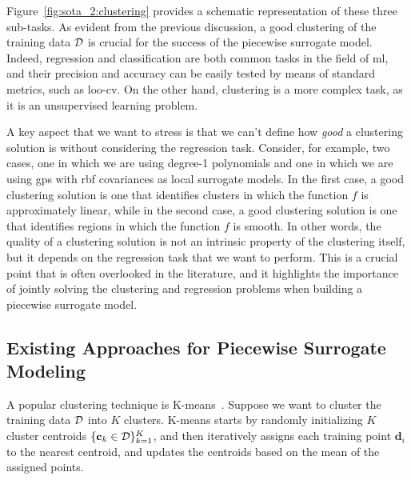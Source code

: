 Figure~\ref{fig:sota_2:clustering} provides a schematic representation of these three sub-tasks. As evident from the previous discussion, a good clustering of the training data $\mathcal{D}$ is crucial for the success of the piecewise surrogate model. Indeed, regression and classification are both common tasks in the field of \gls{ml}, and their precision and accuracy can be easily tested by means of standard metrics, such as \gls{loo}-\gls{cv}. On the other hand, clustering is a more complex task, as it is an unsupervised learning problem.

\smallskip
A key aspect that we want to stress is that we can't define how \textit{good} a clustering solution is without considering the regression task. Consider, for example, two cases, one in which we are using degree-1 polynomials and one in which we are using \glspl{gp} with \gls{rbf} covariances as local surrogate models. In the first case, a good clustering solution is one that identifies clusters in which the function $f$ is approximately linear, while in the second case, a good clustering solution is one that identifies regions in which the function $f$ is smooth. In other words, the quality of a clustering solution is not an intrinsic property of the clustering itself, but it depends on the regression task that we want to perform. This is a crucial point that is often overlooked in the literature, and it highlights the importance of jointly solving the clustering and regression problems when building a piecewise surrogate model.

\smallskip
{}

\subsection{Existing Approaches for Piecewise Surrogate Modeling}

A popular clustering technique is K-means~\cite{lloyd1982least}. Suppose we want to cluster the training data $\mathcal{D}$ into $K$ clusters. K-means starts by randomly initializing $K$ cluster centroids $\{\mathbf{c}_k \in \mathcal{D}\}_{k=1}^K$, and then iteratively assigns each training point $\mathbf{d}_i$ to the nearest centroid, and updates the centroids based on the mean of the assigned points.

